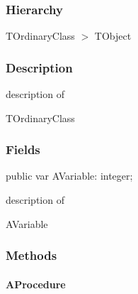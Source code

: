 \documentclass{report}
\newif\ifpdf
\begin{document}
\subsubsection*{\large{\textbf{Hierarchy}}\normalsize\hspace{1ex}\hfill}
TOrdinaryClass {$>$} TObject
\subsubsection*{\large{\textbf{Description}}\normalsize\hspace{1ex}\hfill}
description of \begin{ttfamily}TOrdinaryClass\end{ttfamily}\subsubsection*{\large{\textbf{Fields}}\normalsize\hspace{1ex}\hfill}
\begin{list}{}{
\setlength{\itemindent}{0cm}
\setlength{\listparindent}{0cm}
\setlength{\leftmargin}{\evensidemargin}
\addtolength{\leftmargin}{\tmplength}
\settowidth{\labelsep}{X}
\addtolength{\leftmargin}{\labelsep}
\setlength{\labelwidth}{\tmplength}
}
\label{ok_abstract_sealed.TOrdinaryClass-AVariable}
\item[\textbf{AVariable}\hfill]
\ifpdf
\begin{flushleft}
\fi
\begin{ttfamily}
public var AVariable: integer;\end{ttfamily}

\ifpdf
\end{flushleft}
\fi


\par description of \begin{ttfamily}AVariable\end{ttfamily}\end{list}
\subsubsection*{\large{\textbf{Methods}}\normalsize\hspace{1ex}\hfill}
\paragraph*{AProcedure}\hspace*{\fill}
\end{document}
